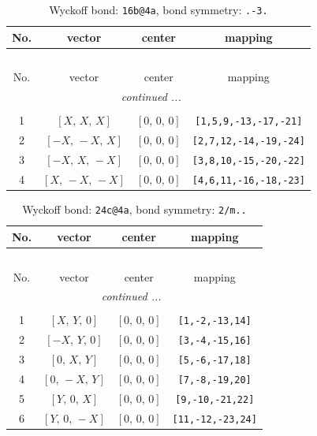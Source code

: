 \documentclass[fleqn,8pt]{jsarticle}
\begin{document}
\begin{longtable}{cccc}
\caption{Wyckoff bond: {\tt 16b@4a}, bond symmetry: {\tt .-3.}}
 \\
 \hline \hline
No. & vector & center & mapping \\ \hline \endfirsthead

\multicolumn{3}{l}{\tablename\ \thetable{}} \\
 \hline \hline
No. & vector & center & mapping \\ \hline \endhead

 \hline \hline
\multicolumn{3}{r}{\footnotesize\it continued ...} \\ \endfoot

 \hline \hline
\multicolumn{3}{r}{} \\ \endlastfoot

1 & $\left[ X,\, X,\, X \right]$ & $\left[ 0,\, 0,\, 0 \right]$ & {\tt [1,5,9,-13,-17,-21]} \\ \hline
2 & $\left[ - X,\, - X,\, X \right]$ & $\left[ 0,\, 0,\, 0 \right]$ & {\tt [2,7,12,-14,-19,-24]} \\ \hline
3 & $\left[ - X,\, X,\, - X \right]$ & $\left[ 0,\, 0,\, 0 \right]$ & {\tt [3,8,10,-15,-20,-22]} \\ \hline
4 & $\left[ X,\, - X,\, - X \right]$ & $\left[ 0,\, 0,\, 0 \right]$ & {\tt [4,6,11,-16,-18,-23]} \\
\end{longtable}
\renewcommand{\arraystretch}{1.2}
\begin{longtable}{cccc}
\caption{Wyckoff bond: {\tt 24c@4a}, bond symmetry: {\tt 2/m..}}
 \\
 \hline \hline
No. & vector & center & mapping \\ \hline \endfirsthead

\multicolumn{3}{l}{\tablename\ \thetable{}} \\
 \hline \hline
No. & vector & center & mapping \\ \hline \endhead

 \hline \hline
\multicolumn{3}{r}{\footnotesize\it continued ...} \\ \endfoot

 \hline \hline
\multicolumn{3}{r}{} \\ \endlastfoot

1 & $\left[ X,\, Y,\, 0 \right]$ & $\left[ 0,\, 0,\, 0 \right]$ & {\tt [1,-2,-13,14]} \\ \hline
2 & $\left[ - X,\, Y,\, 0 \right]$ & $\left[ 0,\, 0,\, 0 \right]$ & {\tt [3,-4,-15,16]} \\ \hline
3 & $\left[ 0,\, X,\, Y \right]$ & $\left[ 0,\, 0,\, 0 \right]$ & {\tt [5,-6,-17,18]} \\ \hline
4 & $\left[ 0,\, - X,\, Y \right]$ & $\left[ 0,\, 0,\, 0 \right]$ & {\tt [7,-8,-19,20]} \\ \hline
5 & $\left[ Y,\, 0,\, X \right]$ & $\left[ 0,\, 0,\, 0 \right]$ & {\tt [9,-10,-21,22]} \\ \hline
6 & $\left[ Y,\, 0,\, - X \right]$ & $\left[ 0,\, 0,\, 0 \right]$ & {\tt [11,-12,-23,24]} \\
\end{longtable}
\end{document}
